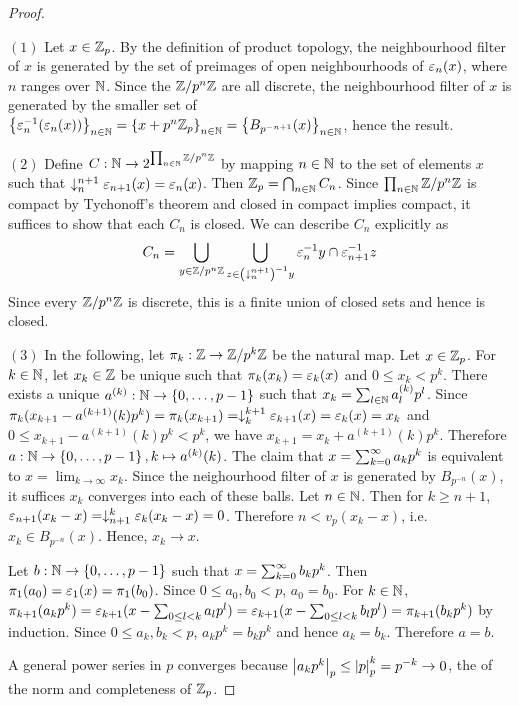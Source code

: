 \begin{proof}~

  $(1)$ Let $x \in \mathbb{Z}_p$. 
  By the definition of product topology, 
  the neighbourhood filter of $x$ is generated by 
  the set of preimages of open neighbourhoods of $\varepsilon_n(x)$, 
  where $n$ ranges over $\mathbb{N}$. 
  Since the $\mathbb{Z}/p^n\mathbb{Z}$ are all discrete, 
  the neighbourhood filter of $x$ is generated by the smaller set of 
  $\left\{\varepsilon_n^{-1}(\varepsilon_n(x))\right\}_{n \in \mathbb{N}} = \left\{x + p^n\mathbb{Z}_p\right\}_{n\in\mathbb{N}}
  = \left\{B_{p^{-n+1}}(x)\right\}_{n\in\mathbb{N}}$,
  hence the result.
  
  $(2)$ Define $C : \mathbb{N} \to 2^{\prod_{n\in\mathbb{N}}^{}\mathbb{Z}/p^{n}\mathbb{Z}}$
  by mapping $n \in \mathbb{N}$ to the set of elements $x$ such that 
  $\downarrow_{n}^{n+1}\varepsilon_{n+1}(x) = \varepsilon_n(x)$.
  Then $\mathbb{Z}_p = \bigcap_{n \in \mathbb{N}} C_n$. 
  Since $\prod_{n \in \mathbb{N}}^{}\mathbb{Z}/p^n\mathbb{Z}$ is compact by Tychonoff's theorem
  and closed in compact implies compact, it suffices to show that
  each $C_n$ is closed. 
  We can describe $C_n$ explicitly as 
  \[
    C_n = \bigcup_{y \in \mathbb{Z}/p^{n}\mathbb{Z}} 
    \bigcup_{z \in \left(\downarrow_{n}^{n+1}\right)^{-1} y} \varepsilon_n^{-1} y \cap \varepsilon_{n+1}^{-1} z
  \]
  Since every $\mathbb{Z}/p^{n}\mathbb{Z}$ is discrete,
  this is a finite union of closed sets and hence is closed. 

  $(3)$ In the following, let $\pi_k : \mathbb{Z} \to \mathbb{Z}/p^k\mathbb{Z}$ be the natural map. 
  Let $x \in \mathbb{Z}_p$. 
  For $k \in \mathbb{N}$, let $x_k \in \mathbb{Z}$ be unique such that 
  $\pi_k(x_k) = \varepsilon_k(x)$ and $0 \leq x_k < p^k$. 
  There exists a unique $a^{(k)} : \mathbb{N} \to \left\{0,\dots,p-1\right\}$ such that 
  $x_k = \sum_{l\in\mathbb{N}}^{} a^{(k)}_l p^l$. 
  Since $\pi_k(x_{k+1} - a^{(k+1)}(k) p^k) = \pi_k(x_{k+1})
  = \downarrow_{k}^{k+1}\varepsilon_{k+1}(x) = \varepsilon_k(x) = x_k$
  and $0 \leq x_{k+1} - a^{(k+1)}(k) p^k < p^k$,
  we have $x_{k+1} = x_k + a^{(k+1)}(k) p^k$.
  Therefore $a : \mathbb{N} \to \left\{0,\dots,p-1\right\}, k \mapsto a^{(k)}(k)$. 
  The claim that $x = \sum_{k = 0}^{\infty} a_k p^k$
  is equivalent to $x = \lim_{k \to \infty} x_k$. 
  Since the neighourhood filter of $x$ is generated by $B_{p^{-n}}(x)$,
  it suffices $x_k$ converges into each of these balls. 
  Let $n \in \mathbb{N}$. 
  Then for $k \geq n + 1$, 
  $\varepsilon_{n+1}(x_k - x) = \downarrow_{n+1}^{k}\varepsilon_k(x_k - x) = 0$.
  Therefore $n < v_p(x_k - x)$, i.e. $x_k \in B_{p^{-n}}(x)$.
  Hence, $x_k \to x$. 

  Let $b : \mathbb{N} \to \left\{0,\dots,p-1\right\}$ such that 
  $x = \sum_{k = 0}^{\infty} b_kp^k$.
  Then $\pi_1(a_0) = \varepsilon_1(x) = \pi_1(b_0)$.
  Since $0 \leq a_0,b_0 < p$, $a_0 = b_0$. 
  For $k \in \mathbb{N}$, 
  $\pi_{k+1}(a_{k}p^{k}) = \varepsilon_{k+1}(x - \sum_{0 \leq l < k}^{}a_lp^l)
  = \varepsilon_{k+1}(x - \sum_{0 \leq l < k}^{}b_lp^l) = \pi_{k+1}(b_{k}p^{k})$
  by induction.
  Since $0 \leq a_k, b_k < p$, $a_k p^k = b_k p^k$ and hence $a_k = b_k$.
  Therefore $a = b$. 

  A general power series in $p$ converges because 
  $\left\vert a_k p^k \right\vert_p \leq \left\vert p \right\vert_p^k = p^{-k} \to 0$,
  the  of the norm
  and completeness of $\mathbb{Z}_p$. 
\end{proof}

